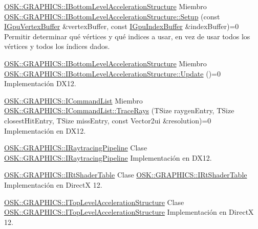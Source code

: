 \mbox{\hyperlink{class_o_s_k_1_1_g_r_a_p_h_i_c_s_1_1_i_bottom_level_acceleration_structure}{OSK\+::\+GRAPHICS\+::\+IBottom\+Level\+Acceleration\+Structure}} Miembro \mbox{\hyperlink{class_o_s_k_1_1_g_r_a_p_h_i_c_s_1_1_i_bottom_level_acceleration_structure_ad0eef5bed4788a7590ba001fb8b84901}{OSK\+::GRAPHICS\+::IBottom\+Level\+Acceleration\+Structure\+::Setup}} (const \mbox{\hyperlink{class_o_s_k_1_1_g_r_a_p_h_i_c_s_1_1_i_gpu_vertex_buffer}{IGpu\+Vertex\+Buffer}} \&vertex\+Buffer, const \mbox{\hyperlink{class_o_s_k_1_1_g_r_a_p_h_i_c_s_1_1_i_gpu_index_buffer}{IGpu\+Index\+Buffer}} \&index\+Buffer)=0 \label{todo__todo000007}%
%
Permitir determinar qué vértices y qué indices a usar, en vez de usar todos los vértices y todos los índices dados.  

\mbox{\hyperlink{class_o_s_k_1_1_g_r_a_p_h_i_c_s_1_1_i_bottom_level_acceleration_structure}{OSK\+::\+GRAPHICS\+::\+IBottom\+Level\+Acceleration\+Structure}} Miembro \mbox{\hyperlink{class_o_s_k_1_1_g_r_a_p_h_i_c_s_1_1_i_bottom_level_acceleration_structure_adc5ee7267c61dff7571d7f72c1374b9b}{OSK\+::GRAPHICS\+::IBottom\+Level\+Acceleration\+Structure\+::Update}} ()=0 \label{todo__todo000008}%
%
Implementación DX12.  

\mbox{\hyperlink{class_o_s_k_1_1_g_r_a_p_h_i_c_s_1_1_i_command_list}{OSK\+::\+GRAPHICS\+::\+ICommand\+List}} Miembro \mbox{\hyperlink{class_o_s_k_1_1_g_r_a_p_h_i_c_s_1_1_i_command_list_a6a335bc609cb8cb3d3e81005902f7545}{OSK\+::GRAPHICS\+::ICommand\+List\+::Trace\+Rays}} (TSize raygen\+Entry, TSize closest\+Hit\+Entry, TSize miss\+Entry, const Vector2ui \&resolution)=0 \label{todo__todo000011}%
%
Implementación en DX12.  

\mbox{\hyperlink{class_o_s_k_1_1_g_r_a_p_h_i_c_s_1_1_i_raytracing_pipeline}{OSK\+::\+GRAPHICS\+::\+IRaytracing\+Pipeline}} Clase \mbox{\hyperlink{class_o_s_k_1_1_g_r_a_p_h_i_c_s_1_1_i_raytracing_pipeline}{OSK\+::GRAPHICS\+::IRaytracing\+Pipeline}}  \label{todo__todo000012}%
%
Implementación en DX12.  

\mbox{\hyperlink{class_o_s_k_1_1_g_r_a_p_h_i_c_s_1_1_i_rt_shader_table}{OSK\+::\+GRAPHICS\+::\+IRt\+Shader\+Table}} Clase \mbox{\hyperlink{class_o_s_k_1_1_g_r_a_p_h_i_c_s_1_1_i_rt_shader_table}{OSK\+::GRAPHICS\+::IRt\+Shader\+Table}}  \label{todo__todo000013}%
%
Implementación en DirectX 12.  

\mbox{\hyperlink{class_o_s_k_1_1_g_r_a_p_h_i_c_s_1_1_i_top_level_acceleration_structure}{OSK\+::\+GRAPHICS\+::\+ITop\+Level\+Acceleration\+Structure}} Clase \mbox{\hyperlink{class_o_s_k_1_1_g_r_a_p_h_i_c_s_1_1_i_top_level_acceleration_structure}{OSK\+::GRAPHICS\+::ITop\+Level\+Acceleration\+Structure}}  \label{todo__todo000014}%
%
Implementación en DirectX 12.  

